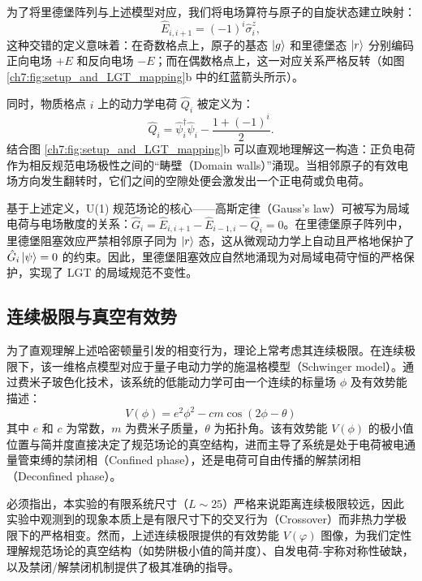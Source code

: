 \documentclass[../main.tex]{subfiles}
\begin{document}
为了将里德堡阵列与上述模型对应，我们将电场算符与原子的自旋状态建立映射：
\begin{equation}
\hat{E}_{i,i+1} = (-1)^i \hat{\sigma}_i^z,
\end{equation}
这种交错的定义意味着：在奇数格点上，原子的基态 $\ket{g}$ 和里德堡态 $\ket{r}$ 分别编码正向电场 $+E$ 和反向电场 $-E$；而在偶数格点上，这一对应关系严格反转（如图 \ref{ch7:fig:setup_and_LGT_mapping}b 中的红蓝箭头所示）。

同时，物质格点 $i$ 上的动力学电荷 $\hat{Q}_i$ 被定义为：
\begin{equation}
\hat{Q}_i = \hat{\psi}_i^\dagger\hat{\psi}_i - \frac{1+(-1)^i}{2}.
\end{equation}
结合图 \ref{ch7:fig:setup_and_LGT_mapping}b 可以直观地理解这一构造：正负电荷作为相反规范电场极性之间的“畴壁（Domain walls）”涌现。当相邻原子的有效电场方向发生翻转时，它们之间的空隙处便会激发出一个正电荷或负电荷。

基于上述定义，U(1) 规范场论的核心——高斯定律（Gauss's law）可被写为局域电荷与电场散度的关系：$\hat{G}_i = \hat{E}_{i,i+1} - \hat{E}_{i-1,i} - \hat{Q}_i = 0$。在里德堡原子阵列中，里德堡阻塞效应严禁相邻原子同为 $\ket{r}$ 态，这从微观动力学上自动且严格地保护了 $\hat{G}_i \ket{\psi} = 0$ 的约束。因此，里德堡阻塞效应自然地涌现为对局域电荷守恒的严格保护，实现了 LGT 的局域规范不变性。

\subsection{连续极限与真空有效势}

为了直观理解上述哈密顿量引发的相变行为，理论上常考虑其连续极限。在连续极限下，该一维格点模型对应于量子电动力学的施温格模型（Schwinger model）。通过费米子玻色化技术，该系统的低能动力学可由一个连续的标量场 $\phi$ 及有效势能描述：
\begin{equation}
V(\phi) = e^2\phi^2 - cm\cos(2\phi-\theta)
\end{equation}
其中 $e$ 和 $c$ 为常数，$m$ 为费米子质量，$\theta$ 为拓扑角。该有效势能 $V(\phi)$ 的极小值位置与简并度直接决定了规范场论的真空结构，进而主导了系统是处于电荷被电通量管束缚的禁闭相（Confined phase），还是电荷可自由传播的解禁闭相（Deconfined phase）。

必须指出，本实验的有限系统尺寸（$L\sim25$）严格来说距离连续极限较远，因此实验中观测到的现象本质上是有限尺寸下的交叉行为（Crossover）而非热力学极限下的严格相变。然而，上述连续极限提供的有效势能 $V(\varphi)$ 图像，为我们定性理解规范场论的真空结构（如势阱极小值的简并度）、自发电荷-宇称对称性破缺，以及禁闭/解禁闭机制提供了极其准确的指导。
\end{document}

